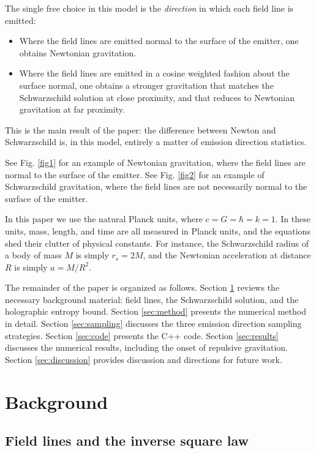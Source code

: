 \documentclass[10pt]{article}
\begin{document}
The single free choice in this model is the {\em direction} in which each field line is emitted:
\begin{itemize}
\item Where the field lines are emitted normal to the surface of the emitter, one obtains Newtonian gravitation.
\item Where the field lines are emitted in a cosine weighted fashion about the surface normal, one obtains a stronger gravitation that matches the Schwarzschild solution at close proximity, and that reduces to Newtonian gravitation at far proximity.
\end{itemize}
This is the main result of the paper: the difference between Newton and Schwarzschild is, in this model, entirely a matter of emission direction statistics.

See Fig. \ref{fig1} for an example of Newtonian gravitation, where the field lines are normal to the surface of the emitter.
See Fig. \ref{fig2} for an example of Schwarzschild gravitation, where the field lines are not necessarily normal to the surface of the emitter.

In this paper we use the natural Planck units, where $c = G = \hbar = k = 1$.
In these units, mass, length, and time are all measured in Planck units, and the equations shed their clutter of physical constants.
For instance, the Schwarzschild radius of a body of mass $M$ is simply $r_s = 2M$, and the Newtonian acceleration at distance $R$ is simply $a = M / R^2$.

The remainder of the paper is organized as follows.
Section \ref{sec:background} reviews the necessary background material: field lines, the Schwarzschild solution, and the holographic entropy bound.
Section \ref{sec:method} presents the numerical method in detail.
Section \ref{sec:sampling} discusses the three emission direction sampling strategies.
Section \ref{sec:code} presents the C++ code.
Section \ref{sec:results} discusses the numerical results, including the onset of repulsive gravitation.
Section \ref{sec:discussion} provides discussion and directions for future work.




\section{Background}
\label{sec:background}

\subsection{Field lines and the inverse square law}
\end{document}
